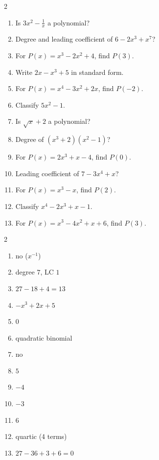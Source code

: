 \documentclass[11pt]{article}
\begin{document}
\begin{recapbox}
\begin{multicols}{2}
\small
\begin{enumerate}[leftmargin=*,itemsep=3pt]
  \item Is $3x^2-\tfrac{1}{x}$ a polynomial?
  \item Degree and leading coefficient of $6-2x^3+x^7$?
  \item For $P(x)=x^3-2x^2+4$, find $P(3)$.
  \item Write $2x-x^3+5$ in standard form.
  \item For $P(x)=x^4-3x^2+2x$, find $P(-2)$.
  \item Classify $5x^2-1$.
  \item Is $\sqrt{x}+2$ a polynomial?
  \item Degree of $(x^3+2)(x^2-1)$?
  \item For $P(x)=2x^3+x-4$, find $P(0)$.
  \item Leading coefficient of $7-3x^4+x$?
  \item For $P(x)=x^3-x$, find $P(2)$.
  \item Classify $x^4-2x^3+x-1$.
  \item For $P(x)=x^3-4x^2+x+6$, find $P(3)$.
\end{enumerate}
\end{multicols}
\end{recapbox}

\begin{keybox}
\begin{multicols}{2}
\small
\begin{enumerate}[leftmargin=*,itemsep=3pt]
  \item no ($x^{-1}$)
  \item degree $7$, LC $1$
  \item $27-18+4=13$
  \item $-x^3+2x+5$
  \item $0$
  \item quadratic binomial
  \item no
  \item $5$
  \item $-4$
  \item $-3$
  \item $6$
  \item quartic (4 terms)
  \item $27-36+3+6=0$
\end{enumerate}
\end{multicols}
\end{keybox}
\end{document}
